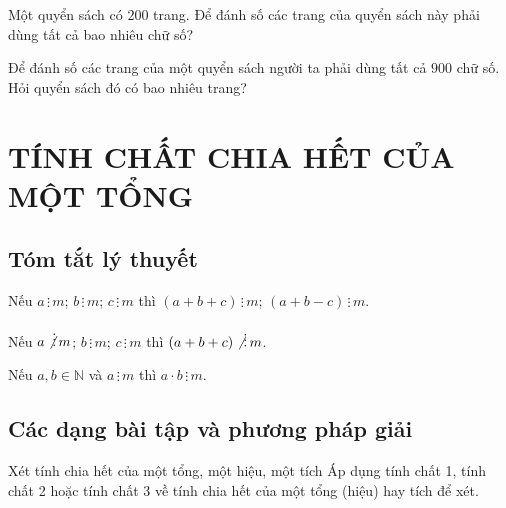 \begin{bt}%
	Một quyển sách có $200$ trang. Để đánh số các trang của quyển sách này phải dùng tất cả bao nhiêu chữ số?
\end{bt}

\begin{bt}%
	Để đánh số các trang của một quyển sách người ta phải dùng tất cả $900$ chữ số. Hỏi quyển sách đó có bao nhiêu trang?
\end{bt}
%
\newpage
\section{TÍNH CHẤT CHIA HẾT CỦA MỘT TỔNG}
\subsection{Tóm tắt lý thuyết}
\begin{tc}
	Nếu $a\,\vdots\, m$; $b\,\vdots\, m$; $c\,\vdots\, m$ thì $(a+b+c)\,\vdots\, m$; $(a+b-c)\,\vdots\, m$.
\end{tc}
\begin{tc}
	Nếu $a\not\vdots\, m$; $b\,\vdots\, m$; $c\,\vdots\, m$ thì $(a+b+c)\not \,\vdots\, m$.
\end{tc}
\begin{tc}
	Nếu $a,b \in \mathbb{N}$ và $a\,\vdots\, m$ thì $a\cdot b \,\vdots\, m$.
\end{tc}
\subsection{Các dạng bài tập và phương pháp giải}
\begin{dang}{Xét tính chia hết của một tổng, một hiệu, một tích}
	Áp dụng tính chất 1, tính chất 2 hoặc tính chất 3 về tính chia hết của một tổng (hiệu) hay tích để xét.
\end{dang}

